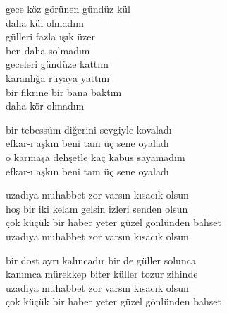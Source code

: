\documentclass[10pt, openright, oneside]{memoir}
\theoremstyle{definition}
\begin{document}
\settowidth{\versewidth}{gece köz görünen gündüz kül}
\begin{cverse}
  gece köz görünen gündüz kül \\
  daha kül olmadım \\
  gülleri fazla ışık üzer \\
  ben daha solmadım \\
  geceleri gündüze kattım \\
  karanlığa rüyaya yattım \\
  bir fikrine bir bana baktım \\
  daha kör olmadım \\
\end{cverse}
\vspace*{\fill}
%
\newpage
{}
\vspace*{\fill}
\settowidth{\versewidth}{bir tebessüm diğerini sevgiyle kovaladı}
\begin{cverse}
  bir tebessüm diğerini sevgiyle kovaladı \\
  efkar-ı aşkın beni tam üç sene oyaladı \\
  o karmaşa dehşetle kaç kabus sayamadım \\
  efkar-ı aşkın beni tam üç sene oyaladı \\
\end{cverse}
\vspace*{\fill}
%
\newpage
{}
\vspace*{\fill}
\settowidth{\versewidth}{çok küçük bir haber yeter güzel gönlünden bahset}
\begin{cverse}
  uzadıya muhabbet zor varsın kısacık olsun \\
  hoş bir iki kelam gelsin izleri senden olsun \\
  çok küçük bir haber yeter güzel gönlünden bahset \\
  uzadıya muhabbet zor varsın kısacık olsun

  bir dost ayrı kalıncadır bir de güller solunca \\
  kanımca mürekkep biter küller tozur zihinde \\
  uzadıya muhabbet zor varsın kısacık olsun \\
  çok küçük bir haber yeter güzel gönlünden bahset \\
\end{cverse}
\vspace*{\fill}
%
\newpage
{}
\vspace*{\fill}
\end{document}
